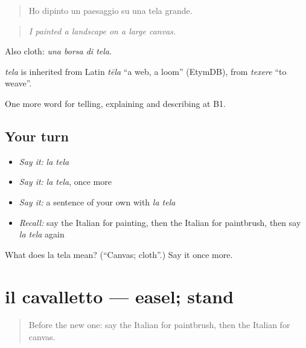 \begin{quote}
Ho dipinto un paesaggio su una tela grande.
\end{quote}

\begin{quote}
\emph{I painted a landscape on a large canvas.}
\end{quote}

Also cloth: \emph{una borsa di tela}.

\begin{cousinweb}
\emph{tela} is inherited from Latin \emph{tēla} \textquotedblleft{}a web, a loom\textquotedblright{} (EtymDB), from \emph{texere} \textquotedblleft{}to weave\textquotedblright{}.
\end{cousinweb}

\begin{grammarlens}[title={What you've built}]
One more word for telling, explaining and describing at B1.
\end{grammarlens}

\subsection*{Your turn}
\begin{itemize}
\raggedright
  \item \emph{Say it:} \emph{la tela}
  \item \emph{Say it:} \emph{la tela}, once more
  \item \emph{Say it:} a sentence of your own with \emph{la tela}
  \item \emph{Recall:} say the Italian for painting, then the Italian for paintbrush, then say \emph{la tela} again
\end{itemize}

\begin{tcolorbox}[breakable,colback=teal!4,colframe=teal!35!black,title={Before you move on}]
What does la tela mean? (\textquotedblleft{}Canvas; cloth\textquotedblright{}.) Say it once more.
\end{tcolorbox}
\section[il cavalletto]{il cavalletto — easel; stand}

\label{lesson:IT-C521-cavalletto}



\begin{quote}
Before the new one: say the Italian for paintbrush, then the Italian for canvas.
\end{quote}

